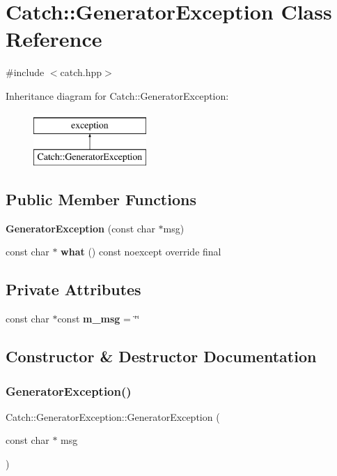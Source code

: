 \section{Catch\+::Generator\+Exception Class Reference}
\label{class_catch_1_1_generator_exception}


{\ttfamily \#include $<$catch.\+hpp$>$}

Inheritance diagram for Catch\+::Generator\+Exception\+:\begin{figure}[H]
\begin{center}
\leavevmode
\includegraphics[height=2.000000cm]{class_catch_1_1_generator_exception}
\end{center}
\end{figure}
\subsection*{Public Member Functions}
\begin{DoxyCompactItemize}
\item 
\textbf{ Generator\+Exception} (const char $\ast$msg)
\item 
const char $\ast$ \textbf{ what} () const noexcept override final
\end{DoxyCompactItemize}
\subsection*{Private Attributes}
\begin{DoxyCompactItemize}
\item 
const char $\ast$const \textbf{ m\+\_\+msg} = \char`\"{}\char`\"{}
\end{DoxyCompactItemize}


\subsection{Constructor \& Destructor Documentation}
\mbox{\label{class_catch_1_1_generator_exception_a3cf9282d555ec32389665ce723bf36ea}} 
\subsubsection{GeneratorException()}
{\footnotesize\ttfamily Catch\+::\+Generator\+Exception\+::\+Generator\+Exception (\begin{DoxyParamCaption}\item[{const char $\ast$}]{msg }\end{DoxyParamCaption})\hspace{0.3cm}{\ttfamily [inline]}}



